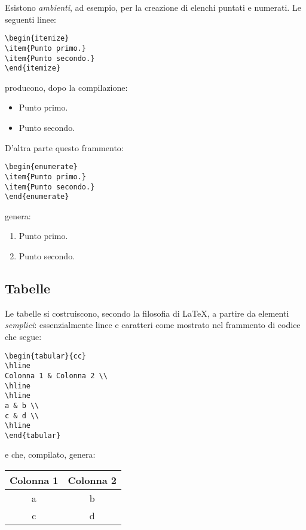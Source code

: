 Esistono \emph{ambienti}, ad esempio, per la creazione di elenchi puntati e
numerati. Le seguenti linee:
\begin{verbatim}
\begin{itemize}
\item{Punto primo.}
\item{Punto secondo.}
\end{itemize}
\end{verbatim}
producono, dopo la compilazione:
\begin{itemize}
\item{Punto primo.}
\item{Punto secondo.}
\end{itemize}
D'altra parte questo frammento:
\begin{verbatim}
\begin{enumerate}
\item{Punto primo.}
\item{Punto secondo.}
\end{enumerate}
\end{verbatim}
genera:
\begin{enumerate}
\item{Punto primo.}
\item{Punto secondo.}
\end{enumerate}


\subsection{Tabelle}

Le tabelle si costruiscono, secondo la filosofia di \LaTeX, a partire da
elementi \emph{semplici}: essenzialmente linee e caratteri come
mostrato nel frammento di codice che segue:
\begin{verbatim}
\begin{tabular}{cc}
\hline
Colonna 1 & Colonna 2 \\
\hline
\hline
a & b \\
c & d \\
\hline
\end{tabular}
\end{verbatim}
e che, compilato, genera:

\vspace{0.5 cm}
\begin{tabular}{cc}
\hline
Colonna 1 & Colonna 2 \\
\hline
\hline
a & b \\
c & d \\
\hline
\end{tabular}
\vspace{0.5 cm}

